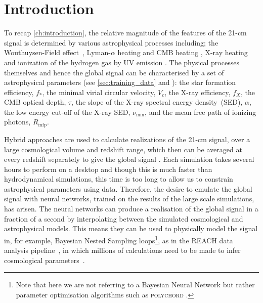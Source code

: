 \renewcommand\thesection{\arabic{chapter}.\arabic{section}}

\section{Introduction}

To recap \cref{ch:introduction}, the relative magnitude of the features of the 21-cm signal is determined by various astrophysical processes including; the Wouthuysen-Field effect~\citep{Wouthuysen1952, Field1959}, Lyman-$\alpha$ heating and CMB heating \citep{Chuzhoy2007, Venumadhav2018, Villanueva2020, Mittal2021, Reis_sta_2021}, X-ray heating and ionization of the hydrogen gas by UV emission \citep{Madau1997}. %
The physical processes themselves and hence the global signal can be characterised by a set of astrophysical parameters (see \cref{sec:training_data} and \cite{Cohen2020}): the star formation efficiency, $f_*$, the minimal virial circular velocity, $V_c$, the X-ray efficiency, $f_X$, the CMB optical depth, $\tau$, the slope of the X-ray spectral energy density~(SED), $\alpha$, the low energy cut-off of the X-ray SED, $\nu_\mathrm{min}$, and the mean free path of ionizing photons, $R_\mathrm{mfp}$.

Hybrid approaches are used to calculate realizations of the 21-cm signal, over a large cosmological volume and redshift range, which then can be averaged at every redshift separately to give the global signal \citep[e.g.][]{Mesinger2011, Visbal_2012, Fialkov_rich_2014, Cohen_global_2017, Reis_sta_2021}. Each simulation takes several hours to perform on a desktop \citep{Monsalve_EDGES_HB_3_2019} and though this is much faster than hydrodynamical simulations, this time is too long to allow us to constrain astrophysical parameters using data. Therefore, the desire to emulate the global signal with neural networks, trained on the results of the large scale simulations, has arisen. The neural networks can produce a realisation of the global signal in a fraction of a second by interpolating between the simulated cosmological and astrophysical models. This means they can be used to physically model the signal in, for example, Bayesian Nested Sampling loops\footnote{Note that here we are not referring to a Bayesian Neural Network \citep[see][]{Javid2020} but rather parameter optimisation algorithms such as \textsc{polychord} \citep[see][]{Handley2015a, Handley2015b}.}, as in the REACH data analysis pipeline~\citep{Anstey_REACH_2021}, in which millions of calculations need to be made to infer cosmological parameters~\citep[][Sims et al. 2021 (in prep.)]{Liu2020, List2020, Chatterjee2021}. 

